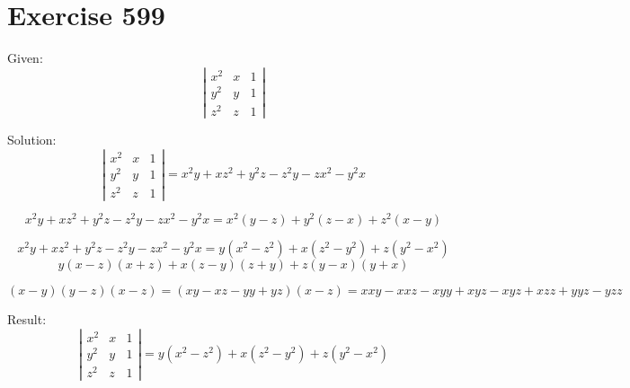 \documentclass[a4paper, 10pt]{scrartcl}
\begin{document}
\section{Exercise 599}

Given:
\[
\left|
    \begin{array}{ccc}
        x^{2} & x & 1\\
        y^{2} & y & 1\\
        z^{2} & z & 1
    \end{array}
\right|
\]

Solution:
\[
\left|
    \begin{array}{ccc}
        x^{2} & x & 1\\
        y^{2} & y & 1\\
        z^{2} & z & 1
    \end{array}
\right| = x^{2}y + xz^{2} + y^{2}z - z^{2}y - zx^{2} - y^{2}x
\]

\[
x^{2}y + xz^{2} + y^{2}z - z^{2}y - zx^{2} - y^{2}x = x^{2}(y - z) + y^{2}(z - x) + z^{2}(x - y)
\]

\[
x^{2}y + xz^{2} + y^{2}z - z^{2}y - zx^{2} - y^{2}x = y(x^{2} - z^{2}) + x(z^{2} - y^{2}) + z(y^{2} - x^{2})
\]
\[
y(x - z)(x + z) + x(z - y)(z + y) + z(y - x)(y + x)
\]

\[
(x - y)(y - z)(x - z) = (xy - xz - yy + yz)(x - z) = xxy - xxz - xyy + xyz - xyz + xzz + yyz - yzz
\]

Result:
\[
\left|
    \begin{array}{ccc}
        x^{2} & x & 1\\
        y^{2} & y & 1\\
        z^{2} & z & 1
    \end{array}
\right| =  y(x^{2} - z^{2}) + x(z^{2} - y^{2}) + z(y^{2} - x^{2})
\]
\end{document}
